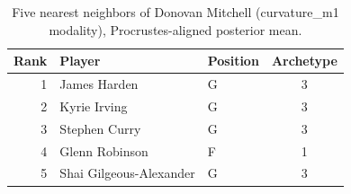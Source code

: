 \begin{table}[htbp]
  \centering\small
  \begin{tabular}{rllc}
    \toprule
    Rank & Player & Position & Archetype \\
    \midrule
    1 & James Harden & G & 3 \\
    2 & Kyrie Irving & G & 3 \\
    3 & Stephen Curry & G & 3 \\
    4 & Glenn Robinson & F & 1 \\
    5 & Shai Gilgeous-Alexander & G & 3 \\
    \bottomrule
  \end{tabular}
  \caption{Five nearest neighbors of Donovan Mitchell (curvature_m1 modality), Procrustes-aligned posterior mean.}
  \label{tab:Donovan_Mitchell_neighbors_curvature_m1}
\end{table}

